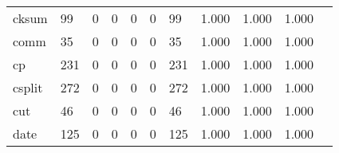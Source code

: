 \begin{longtable}{lp{1.2cm}p{1.2cm}p{1.2cm}p{1.2cm}p{1.2cm}p{1.2cm}p{1.2cm}p{1.2cm}p{1.2cm}p{1.2cm}}
cksum     &                                    99 &                                                  0 &                                                  0 &                                                  0 &                                                  0 &                                                 99 &                                         1.000 &                                              1.000 &                                              1.000 \\
comm      &                                    35 &                                                  0 &                                                  0 &                                                  0 &                                                  0 &                                                 35 &                                         1.000 &                                              1.000 &                                              1.000 \\
cp        &                                   231 &                                                  0 &                                                  0 &                                                  0 &                                                  0 &                                                231 &                                         1.000 &                                              1.000 &                                              1.000 \\
csplit    &                                   272 &                                                  0 &                                                  0 &                                                  0 &                                                  0 &                                                272 &                                         1.000 &                                              1.000 &                                              1.000 \\
cut       &                                    46 &                                                  0 &                                                  0 &                                                  0 &                                                  0 &                                                 46 &                                         1.000 &                                              1.000 &                                              1.000 \\
date      &                                   125 &                                                  0 &                                                  0 &                                                  0 &                                                  0 &                                                125 &                                         1.000 &                                              1.000 &                                              1.000 \\

\end{longtable}
